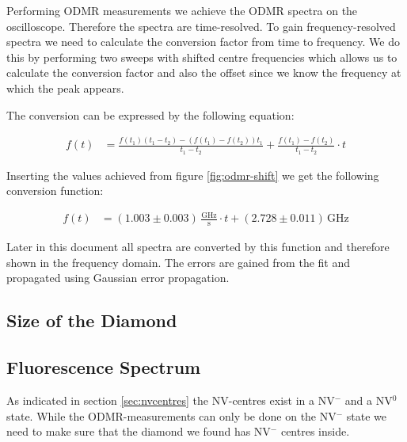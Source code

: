 Performing ODMR measurements we achieve the ODMR spectra on the oscilloscope. Therefore the spectra are time-resolved. To gain frequency-resolved spectra we need to calculate the conversion factor from time to frequency. We do this by performing two sweeps with shifted centre frequencies which allows us to calculate the conversion factor and also the offset since we know the frequency at which the peak appears.

The conversion can be expressed by the following equation:

\begin{align}
	f(t)&=\frac{f(t_1)(t_1-t_2)-(f(t_1)-f(t_2))t_1}{t_1-t_2}+\frac{f(t_1)-f(t_2)}{t_1-t_2}\cdot t
\end{align}

Inserting the values achieved from figure \ref{fig:odmr-shift} we get the following conversion function:

\begin{align}
	f(t)&=(1.003\pm0.003)\,\mathrm{\frac{GHz}{s}}\cdot t+(2.728\pm0.011)\,\mathrm{GHz}
\end{align}

Later in this document all spectra are converted by this function and therefore shown in the frequency domain. The errors are gained from the fit and propagated using Gaussian error propagation.

\subsection{Size of the Diamond}

\subsection{Fluorescence Spectrum}
As indicated in section \ref{sec:nvcentres} the NV-centres exist in a NV$^-$ and a NV$^0$ state. While the ODMR-measurements can only be done on the NV$^-$ state we need to make sure that the diamond we found has NV$^-$ centres inside.\\

